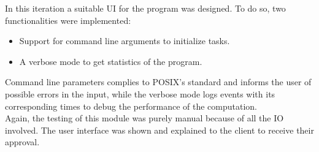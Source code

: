      In this iteration a suitable UI for the program was designed. To do so,
      two functionalities were implemented:
      \begin{itemize}
        \item Support for command line arguments to initialize tasks.
        \item A verbose mode to get statistics of the program.
      \end{itemize}

      Command line parameters complies to POSIX's standard and informs the
      user of possible errors in the input, while the verbose mode logs events
      with its corresponding times to debug the performance of the
      computation.\\

      Again, the testing of this module was purely manual because of all
      the IO involved. The user interface was shown and explained to the client
      to receive their approval.\\
